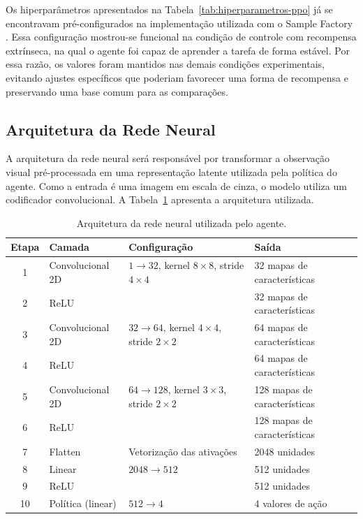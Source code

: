 Os hiperparâmetros apresentados na Tabela~\ref{tab:hiperparametros-ppo} já se encontravam pré-configurados na implementação utilizada com o Sample Factory \cite{sample_factory}. Essa configuração mostrou-se funcional na condição de controle com recompensa extrínseca, na qual o agente foi capaz de aprender a tarefa de forma estável. Por essa razão, os valores foram mantidos nas demais condições experimentais, evitando ajustes específicos que poderiam favorecer uma forma de recompensa e preservando uma base comum para as comparações.

\subsection{Arquitetura da Rede Neural}

A arquitetura da rede neural será responsável por transformar a observação visual pré-processada em uma representação latente utilizada pela política do agente. Como a entrada é uma imagem em escala de cinza, o modelo utiliza um codificador convolucional. A Tabela~\ref{tab:arquitetura-rede-ppo} apresenta a arquitetura utilizada.

\begin{table}[h!]
\centering
\caption{Arquitetura da rede neural utilizada pelo agente.}
\label{tab:arquitetura-rede-ppo}
\begin{tabular}{c|l|l|l}
\hline
\textbf{Etapa} & \textbf{Camada} & \textbf{Configuração} & \textbf{Saída} \\
\hline
1 & Convolucional 2D & $1 \rightarrow 32$, kernel $8 \times 8$, stride $4 \times 4$ & 32 mapas de características \\
2 & ReLU &  & 32 mapas de características \\
3 & Convolucional 2D & $32 \rightarrow 64$, kernel $4 \times 4$, stride $2 \times 2$ & 64 mapas de características \\
4 & ReLU &  & 64 mapas de características \\
5 & Convolucional 2D & $64 \rightarrow 128$, kernel $3 \times 3$, stride $2 \times 2$ & 128 mapas de características \\
6 & ReLU &  & 128 mapas de características \\
7 & Flatten & Vetorização das ativações & 2048 unidades \\
8 & Linear & $2048 \rightarrow 512$ & 512 unidades \\
9 & ReLU &  & 512 unidades \\
10 & Política (linear) & $512 \rightarrow 4$ & 4 valores de ação \\
\hline
\end{tabular}
\end{table}

